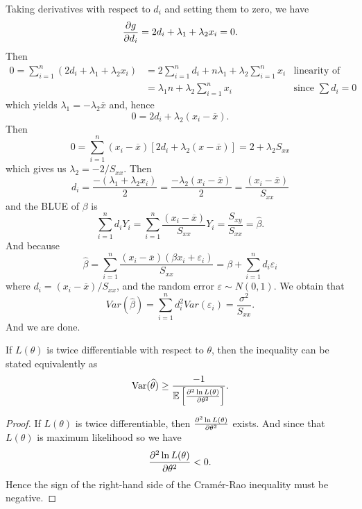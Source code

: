 \begin{example}
Taking derivatives with respect to $d_i$ and setting them to zero, we have
\[
    \pdv{g}{d_i} = 2d_i + \lambda_1 + \lambda_2 x_i = 0.
\]
Then
\begin{align*}
    0 = \sum_{i=1}^{n} (2d_i + \lambda_1 + \lambda_2 x_i) &= 2 \sum_{i=1}^{n} d_i + n\lambda_1 + \lambda_2 \sum_{i=1}^{n} x_i & \text{linearity of summation}\\
    &= \lambda_1 n + \lambda_2 \sum^n_{i=1} x_i & \text{since } \sum d_i = 0
\end{align*}
which yields $\lambda_1 = - \lambda_2 \overline{x}$ and, hence
\[
    0 = 2d_i + \lambda_2 (x_i - \overline{x}).
\]
Then 
\[
    0 = \sum^n_{i=1} (x_i - \overline{x}) [2d_i + \lambda_2 (x - \overline{x})] = 2 + \lambda_2 S_{xx}
\]
which gives us $\lambda_2 = -2 / S_{xx}$. Then 
\[
    d_i = \frac{-(\lambda_1 + \lambda_2 x_i)}{2} = \frac{-\lambda_2(x_i - \overline{x})}{2}
    = \frac{(x_i - \overline{x})}{S_{xx}}
\]
and the BLUE of $\beta$ is 
\[
    \sum^n_{i=1} d_i Y_i = \sum_{i=1}^{n} \frac{(x_i - \overline{x})}{S_{xx}} Y_i = \frac{S_{xy}}{S_{xx}} = \widehat{\beta}.
\]
And because
\[
    \widehat{\beta} = \sum_{i=1}^{n} \frac{(x_i - \overline{x})(\beta x_i + \varepsilon_i)}{S_{xx}}
    = \beta + \sum^n_{i=1} d_i \varepsilon_i
\]
where $d_i = (x_i - \overline{x})/S_{xx}$, and the random error $\varepsilon \sim N(0,1)$. We obtain that 
\[
    Var(\widehat{\beta}) = \sum_{i=1}^{n} d^2_i Var(\varepsilon_i) = \frac{\sigma^2}{S_{xx}}.
\]
And we are done.
\end{example}


\begin{corollary}
    If $L(\theta)$ is twice differentiable with respect to $\theta$, then the inequality 
    can be stated equivalently as
    \begin{equation}
        \text{Var}(\widehat{\theta}) \geq \frac{-1}{\mathbb{E} \left[ \pdv[order={2}]{\ln L(\theta)}{\theta} \right]}.
    \end{equation}
\end{corollary}
\begin{proof}
    If $L(\theta)$ is twice differentiable, then $\pdv[order={2}]{\ln L(\theta)}{\theta}$ exists. 
    And since that $L(\theta)$ is maximum likelihood so we have
    \[
        \pdv[order={2}]{\ln L(\theta)}{\theta} < 0.
    \]
    Hence the sign of the right-hand side of the Cramér-Rao inequality must be negative.
\end{proof}

